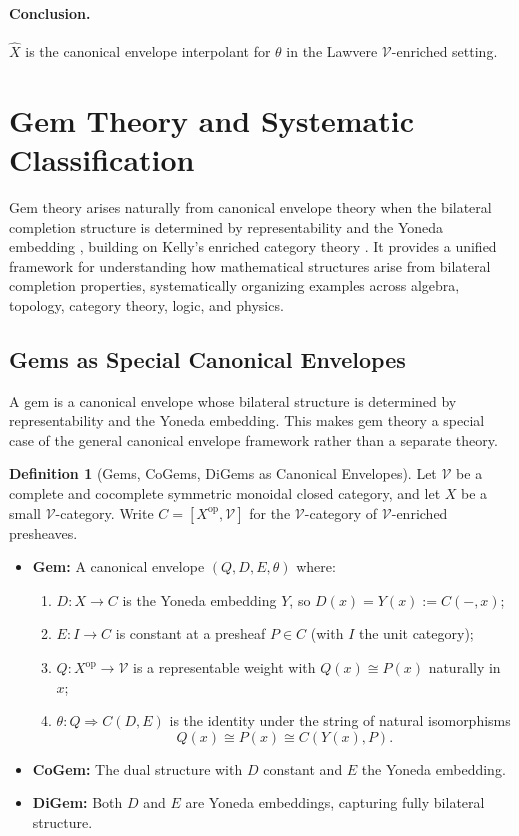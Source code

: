 \documentclass[11pt]{article}
\theoremstyle{plain}
\theoremstyle{definition}
\newtheorem{definition}[theorem]{Definition}
\theoremstyle{remark}
\newcommand{\V}{\mathcal{V}}
\newcommand{\op}{\mathrm{op}}
\begin{document}
\paragraph{Conclusion.}
$\widehat{X}$ is the canonical envelope interpolant for $\theta$ in the
Lawvere $\V$-enriched setting.

\section{Gem Theory and Systematic Classification}

Gem theory arises naturally from canonical envelope theory when the bilateral completion structure is determined by representability and the Yoneda embedding \cite{yoneda1954homology}, building on Kelly's enriched category theory \cite{kelly1982basic}. It provides a unified framework for understanding how mathematical structures arise from bilateral completion properties, systematically organizing examples across algebra, topology, category theory, logic, and physics.

\subsection{Gems as Special Canonical Envelopes}

A gem is a canonical envelope whose bilateral structure is determined by representability and the Yoneda embedding. This makes gem theory a special case of the general canonical envelope framework rather than a separate theory.

\begin{definition}[Gems, CoGems, DiGems as Canonical Envelopes]
Let $\V$ be a complete and cocomplete symmetric monoidal closed category, and let $X$ be a small $\V$-category. Write $C = [X^{\op}, \V]$ for the $\V$-category of $\V$-enriched presheaves.

\begin{itemize}
\item \textbf{Gem:} A canonical envelope $(Q, D, E, \theta)$ where:
\begin{enumerate}
\item $D : X \to C$ is the Yoneda embedding $Y$, so $D(x) = Y(x) := C(-, x)$;
\item $E : I \to C$ is constant at a presheaf $P \in C$ (with $I$ the unit category);
\item $Q : X^{\op} \to \V$ is a representable weight with $Q(x) \cong P(x)$ naturally in $x$;
\item $\theta : Q \Rightarrow C(D, E)$ is the identity under the string of natural isomorphisms
$$
Q(x) \cong P(x) \cong C(Y(x), P).
$$
\end{enumerate}

\item \textbf{CoGem:} The dual structure with $D$ constant and $E$ the Yoneda embedding.

\item \textbf{DiGem:} Both $D$ and $E$ are Yoneda embeddings, capturing fully bilateral structure.
\end{itemize}
\end{definition}
\end{document}
